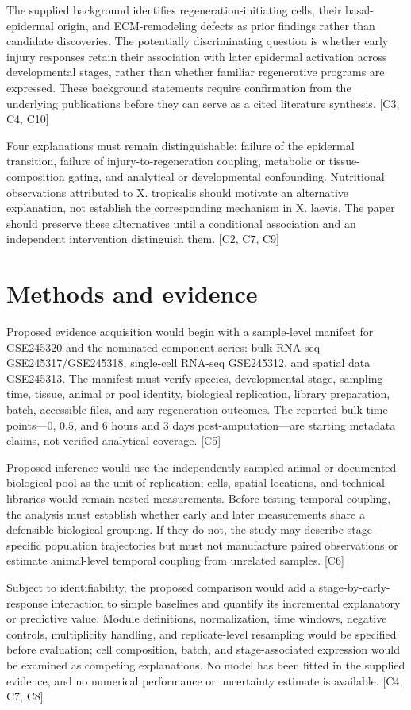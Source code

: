 \documentclass[11pt]{article}
\begin{document}
The supplied background identifies regeneration-initiating cells, their basal-epidermal origin, and ECM-remodeling defects as prior findings rather than candidate discoveries. The potentially discriminating question is whether early injury responses retain their association with later epidermal activation across developmental stages, rather than whether familiar regenerative programs are expressed. These background statements require confirmation from the underlying publications before they can serve as a cited literature synthesis. [C3, C4, C10]

Four explanations must remain distinguishable: failure of the epidermal transition, failure of injury-to-regeneration coupling, metabolic or tissue-composition gating, and analytical or developmental confounding. Nutritional observations attributed to X. tropicalis should motivate an alternative explanation, not establish the corresponding mechanism in X. laevis. The paper should preserve these alternatives until a conditional association and an independent intervention distinguish them. [C2, C7, C9]

\section{Methods and evidence}
Proposed evidence acquisition would begin with a sample-level manifest for GSE245320 and the nominated component series: bulk RNA-seq GSE245317/GSE245318, single-cell RNA-seq GSE245312, and spatial data GSE245313. The manifest must verify species, developmental stage, sampling time, tissue, animal or pool identity, biological replication, library preparation, batch, accessible files, and any regeneration outcomes. The reported bulk time points—$0$, $0.5$, and $6$ hours and $3$ days post-amputation—are starting metadata claims, not verified analytical coverage. [C5]

Proposed inference would use the independently sampled animal or documented biological pool as the unit of replication; cells, spatial locations, and technical libraries would remain nested measurements. Before testing temporal coupling, the analysis must establish whether early and later measurements share a defensible biological grouping. If they do not, the study may describe stage-specific population trajectories but must not manufacture paired observations or estimate animal-level temporal coupling from unrelated samples. [C6]

Subject to identifiability, the proposed comparison would add a stage-by-early-response interaction to simple baselines and quantify its incremental explanatory or predictive value. Module definitions, normalization, time windows, negative controls, multiplicity handling, and replicate-level resampling would be specified before evaluation; cell composition, batch, and stage-associated expression would be examined as competing explanations. No model has been fitted in the supplied evidence, and no numerical performance or uncertainty estimate is available. [C4, C7, C8]
\end{document}
